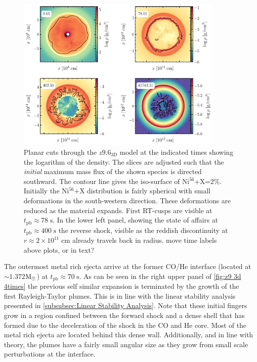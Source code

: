 \documentclass[fleqn,usenatbib]{mnras}
\newcommand{\nickel}{$\mathrm{Ni^{56}}$\xspace}
\newcommand{\tracer}{$\mathrm{X}$\xspace}
\newcommand{\solm}{\xspace\ensuremath{\rm{M_{\odot}}}}
\newcommand{\COM}[1]{{\color{red}#1}}
\begin{document}
\fi
\begin{figure}
 \centering
 \includegraphics[width=0.9\textwidth]{pic/rho_cuts_z9_3d_4times.pdf}
 \caption{Planar cuts through the $z9.6_{\mathrm{3D}}$ model at the indicated times showing the logarithm of the density. The slices are adjusted such that the \textit{initial} maximum mass flux of the shown species is directed southward. The contour line gives the iso-surface of \nickel+\tracer=2\%. Initially the \nickel+\tracer distribution is fairly spherical with small deformations in the south-western direction. These deformations are reduced as the material expands. First RT-cusps are visible at $t_{\mathrm{pb}}\approx 78\;\mathrm{s}$. In the lower left panel, showing the state of affairs at  $t_{\mathrm{pb}}\approx 400\;\mathrm{s}$ the reverse shock, visible as the reddish discontinuity at $r\approx 2\times 10^{11}\;\mathrm{cm}$ already travels back in radius. \COM{move time labels above plots, or in text?}}
 \label{fig:z9 3d 4times}
\end{figure}

The outermost metal rich ejecta arrive at the former CO/He interface (located at $\sim1.372$\solm) at $t_{\mathrm{pb}}\approx 70\;\mathrm{s}$. As can be seen in the right upper panel of \autoref{fig:z9 3d 4times} the previous self similar expansion is terminated by the growth of the first Rayleigh-Taylor plumes. This is in line with the linear stability analysis presented in \autoref{subsubsec:Linear Stability Analysis}. Note that these initial fingers grow in a region confined between the forward shock and a dense shell that has formed due to the deceleration of the shock in the CO and He core. Most of the metal rich ejecta are located behind this dense wall. Additionally, and in line with theory, the plumes have a fairly small angular size as they grow from small scale perturbations at the interface. 
\end{document}
